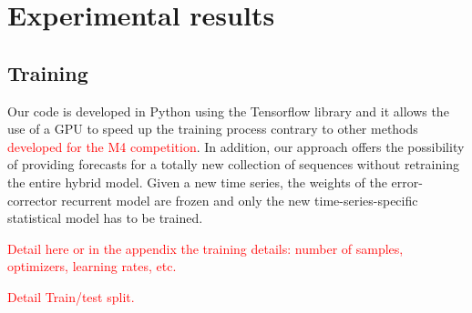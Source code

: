 \documentclass{article} %
\begin{document}
\section{Experimental results}
\label{sec:exp}

\subsection{Training}

Our code is developed in Python using the Tensorflow library and it allows the use of a GPU to speed up the training process contrary to other methods \textcolor{red}{\cite{} developed for the M4 competition}. In addition, our approach offers the possibility of providing forecasts for a totally  new collection of sequences without retraining the entire hybrid model. Given a new time series,  the weights of the error-corrector recurrent model are frozen and only the new time-series-specific statistical model has to be trained.%


\textcolor{red}{Detail here or in the appendix the training details: number of samples, optimizers, learning rates, etc.}

\vspace{.2cm}

\textcolor{red}{Detail Train/test split.}
\end{document}

